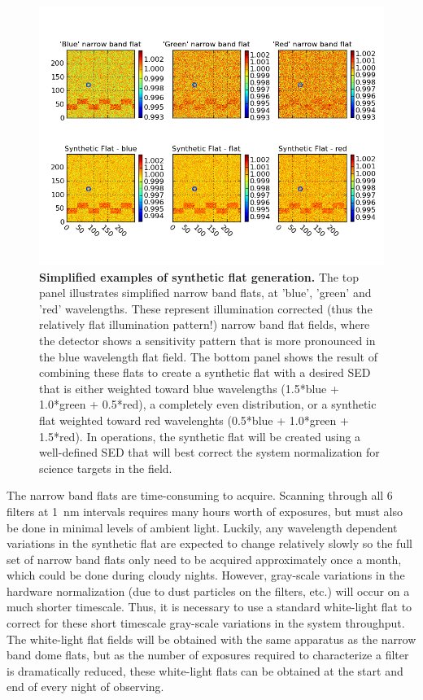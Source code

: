 \documentclass[12pt,preprint]{aastex}
\begin{document}
\begin{figure}[htbp]
\includegraphics[width=6in]{narrowband_flat}
\caption{ {\small
{\bf Simplified examples of synthetic flat generation.} 
The top panel illustrates simplified narrow band flats, at 'blue',
'green' and 'red' wavelengths. These represent illumination corrected
(thus the relatively flat illumination pattern!) narrow band flat
fields, where the detector shows a sensitivity pattern that is more
pronounced in the blue wavelength flat field. The bottom panel shows
the result of combining these flats to create a synthetic flat with a
desired SED that is either weighted toward blue wavelengths (1.5*blue
+ 1.0*green + 0.5*red), a completely even distribution, or a synthetic
flat weighted toward red wavelenghts (0.5*blue + 1.0*green + 1.5*red).
In operations, the synthetic flat will be created using a well-defined
SED that will best correct the system normalization for science
targets in the field. }}
\label{fig:narrowband}
\end{figure}

The narrow band flats are time-consuming to acquire. Scanning through
all 6 filters at 1~nm intervals requires many hours worth of
exposures, but must also be done in minimal levels of ambient
light. Luckily, any wavelength dependent variations in the synthetic
flat are expected to change relatively slowly so the full set of
narrow band flats only need to be acquired approximately once a month,
which could be done during cloudy nights. However, gray-scale
variations in the hardware normalization (due to dust particles on the
filters, etc.) will occur on a much shorter timescale.  Thus, it is
necessary to use a standard white-light flat to correct for these
short timescale gray-scale variations in the system throughput.  The
white-light flat fields will be obtained with the same apparatus as
the narrow band dome flats, but as the number of exposures required to
characterize a filter is dramatically reduced, these white-light flats
can be obtained at the start and end of every night of observing.
\end{document}
